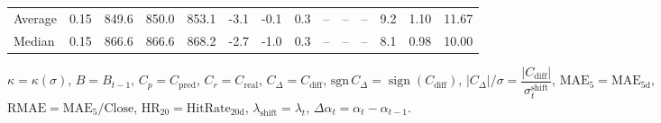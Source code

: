 \begin{threeparttable}
{\begin{tabular}{lrrrrrrrrrrrrr}
Average &     0.15 & 849.6 & 850.0 & 853.1 &       -3.1 &                     -0.1 &                 0.3 &         -- &        -- &             -- &              9.2 &            1.10 &                  11.67 \\
 Median &     0.15 & 866.6 & 866.6 & 868.2 &       -2.7 &                     -1.0 &                 0.3 &         -- &        -- &             -- &              8.1 &            0.98 &                  10.00 \\
\bottomrule
\end{tabular}
}
\begin{tablenotes}\footnotesize
\item $\kappa=\kappa(\sigma)$, $B=B_{t-1}$, $C_p=C_{\text{pred}}$, $C_r=C_{\text{real}}$, $C_\Delta=C_{\text{diff}}$, $\mathrm{sgn}\,C_\Delta=\operatorname{sign}(C_{\text{diff}})$, $|C_\Delta|/\sigma=\dfrac{|C_{\text{diff}}|}{\sigma_t^{\text{shift}}}$, $\mathrm{MAE}_5=\mathrm{MAE}_{5\text{d}}$, $\mathrm{RMAE}= \mathrm{MAE}_5 / \text{Close}$, $\mathrm{HR}_{20}=\mathrm{HitRate}_{20\text{d}}$, 
$\lambda_{\text{shift}}=\lambda_t$, 
$\Delta\alpha_t=\alpha_t-\alpha_{t-1}$.
\end{tablenotes}
\end{threeparttable}
\endgroup

